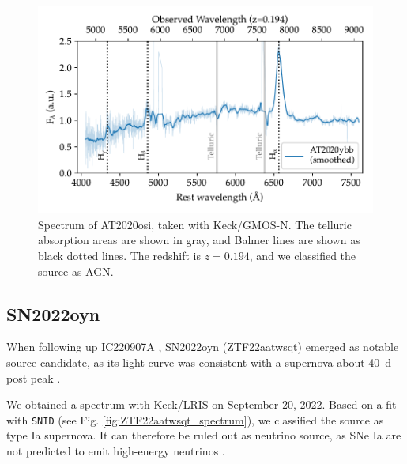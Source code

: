 \documentclass[
    a4paper, %
    fontsize=10pt, %
    twoside=true, %
    numbers=noenddot, %
    fontmethod=tex,
]{kaobook}
\begin{document}
\begin{figure}[htb]
    \includegraphics[width=1\textwidth]{fu/ZTF21abecljv_spectrum.pdf}
    \caption[AT2020osi spectrum]{Spectrum of AT2020osi, taken with Keck/GMOS-N. The telluric absorption areas are shown in gray, and Balmer lines are shown as black dotted lines. The redshift is $z= 0.194$, and we classified the source as AGN.}
\end{figure}



\subsection{SN2022oyn}
When following up IC220907A , SN2022oyn (ZTF22aatwsqt) emerged as notable source candidate, as its light curve was consistent with a supernova about \SI{40}{\day} post peak .

We obtained a spectrum with Keck/LRIS on September 20, 2022. Based on a fit with \texttt{SNID} (see Fig. \ref{fig:ZTF22aatwsqt_spectrum}), we classified the source as type Ia supernova. It can therefore be ruled out as neutrino source, as SNe Ia are not predicted to emit high-energy neutrinos .
\end{document}
